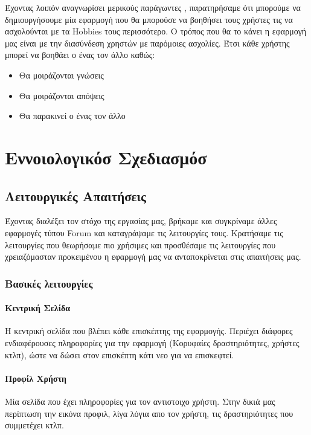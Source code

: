\documentclass[nonacm, language=english, language=greek]{acmart}
\newcommand{\en}[1]{\textlatin{#1}}
\begin{document}
Έχοντας λοιπόν αναγνωρίσει μερικούς παράγωντες , παρατηρήσαμε ότι μπορούμε να δημιουργήσουμε μία εφαρμογή που θα μπορούσε να βοηθήσει τους χρήστες τις να ασχολούνται με τα \en{Hobbies} τους περισσότερο.
Ο τρόπος που θα το κάνει η εφαρμογή μας είναι με την διασύνδεση χρηστών με παρόμοιες ασχολίες.
Έτσι κάθε χρήστης μπορεί να βοηθάει ο ένας τον άλλο καθώς:
\begin{itemize}
    \item Θα μοιράζονται γνώσεις
    \item Θα μοιράζονται απόψεις
    \item Θα παρακινεί ο ένας τον άλλο
\end{itemize}

\section{Εννοιολογικόσ Σχεδιασμόσ}

\subsection{Λειτουργικές Απαιτήσεις}

Έχοντας διαλέξει τον στόχο της εργασίας μας, βρήκαμε και συγκρίναμε άλλες εφαρμογές τύπου \en{Forum} και καταγράψαμε τις λειτουργίες τους.
Κρατήσαμε τις λειτουργίες που θεωρήσαμε πιο χρήσιμες και προσθέσαμε τις λειτουργίες που χρειαζόμασταν προκειμένου η εφαρμογή μας να ανταποκρίνεται στις απαιτήσεις μας.

\subsubsection{Βασικές λειτουργίες}

\paragraph{Κεντρική Σελίδα} 
Η κεντρική σελίδα που βλέπει κάθε επισκέπτης της εφαρμογής. Περιέχει διάφορες
ενδιαφέρουσες πληροφορίες για την εφαρμογή (Κορυφαίες δραστηριότητες, χρήστες
κτλπ), ώστε να δώσει στον επισκέπτη κάτι νεο για να επισκεφτεί.
 
\paragraph{Προφίλ Χρήστη}
Μία σελίδα που έχει πληροφορίες για τον αντιστοιχο χρήστη. Στην δικιά μας περίπτωση την εικόνα προφιλ, λίγα λόγια απο τον χρήστη, τις δραστηριότητες που συμμετέχει κτλπ.
 
\end{document}
